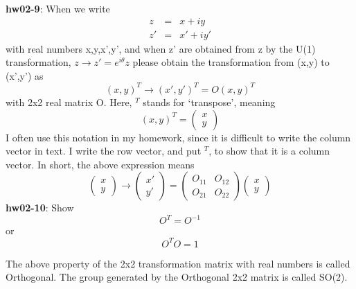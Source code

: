 \documentclass[12pt]{article}
\begin{document}
{\bf hw02-9}: When we write
\begin{eqnarray} 
z &=& x + iy\\
z' &=& x' + iy'
\end{eqnarray} 
with real numbers x,y,x',y', and when z' are obtained from
z by the U(1) transformation,
$z \to z' = e^{i\theta} z$
please obtain the transformation from (x,y) to (x',y') as
\begin{equation}
  \label{eq:3}
  (x,y)^T \to (x',y')^T = O (x,y)^T
\end{equation}
with 2x2 real matrix O.  Here, $^T$ stands for `transpose',
meaning
\begin{equation}
  \label{eq:1}
  (x,y)^T =
  \begin{pmatrix}
    x\\y
  \end{pmatrix}
\end{equation}
I often use this notation in my homework, since it is
difficult to write the column vector in text.  I write
the row vector, and put $^T$, to show that it is a column
vector.  In short, the above expression means
\begin{equation}
  \label{eq:2}
  \begin{pmatrix}
    x\\y 
  \end{pmatrix} \rightarrow
  \begin{pmatrix}
    x'\\y'
  \end{pmatrix} = 
  \begin{pmatrix}
    O_{11}&O_{12}\\
    O_{21}&O_{22}
  \end{pmatrix}
  \begin{pmatrix}
    x\\y
  \end{pmatrix}
\end{equation}
{\bf hw02-10}: Show
\begin{equation}
  \label{eq:4}
  O^T = O^{-1}
\end{equation}
or
\begin{equation}
  \label{eq:5}
O^T O = 1  
\end{equation}


The above property of the 2x2 transformation matrix
with real numbers is called Orthogonal.  The group
generated by the Orthogonal 2x2 matrix is called SO(2).\\
\end{document}
